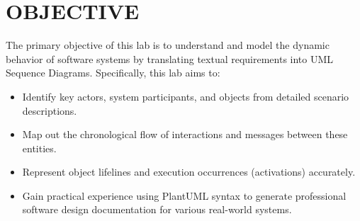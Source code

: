 \chapter{OBJECTIVE}\label{obj}


The primary objective of this lab is to understand and model the dynamic behavior of software systems by translating textual requirements into UML Sequence Diagrams. Specifically, this lab aims to:
\begin{itemize}
    \item Identify key actors, system participants, and objects from detailed scenario descriptions.
    \item Map out the chronological flow of interactions and messages between these entities.
    \item Represent object lifelines and execution occurrences (activations) accurately.
    \item Gain practical experience using PlantUML syntax to generate professional software design documentation for various real-world systems.
\end{itemize}








